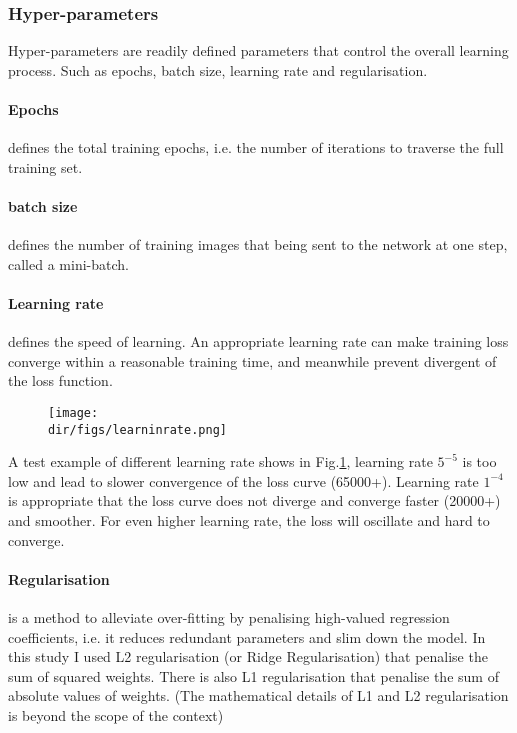 \subsubsection{Hyper-parameters}
Hyper-parameters are readily defined parameters that control the overall learning process. Such as epochs, batch size, learning rate and regularisation.

\paragraph{Epochs} defines the total training epochs, i.e. the number of iterations to traverse the full training set.

\paragraph{batch size} defines the number of training images that being sent to the network at one step, called a mini-batch.

\paragraph{Learning rate} defines the speed of learning. An appropriate learning rate can make training loss converge within a reasonable training time, and meanwhile prevent divergent of the loss function.

\begin{figure}[htbp]
  \centering
  \texttt{[image: \\dir/figs/learninrate.png]}
  \caption{}
  \label{learninrate}
\end{figure}

A test example of different learning rate shows in Fig.\ref{learninrate}, learning rate $5^{-5}$ is too low and lead to slower convergence of the loss curve (65000+). Learning rate $1^{-4}$ is appropriate that the loss curve does not diverge and converge faster (20000+) and smoother. For even higher learning rate, the loss will oscillate and hard to converge.

\paragraph{Regularisation} is a method to alleviate over-fitting by penalising high-valued regression coefficients, i.e. it reduces redundant parameters and slim down the model. In this study I used L2 regularisation (or Ridge Regularisation) that penalise the sum of squared weights. There is also L1 regularisation that penalise the sum of absolute values of weights. (The mathematical details of L1 and L2 regularisation is beyond the scope of the context)

